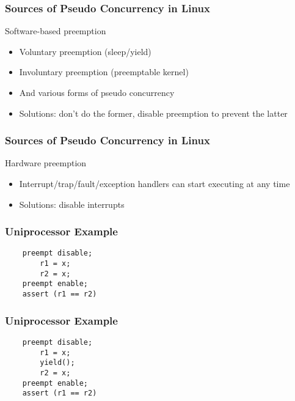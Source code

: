 \begin{frame}[fragile]
    \frametitle{Sources of Pseudo Concurrency in Linux}
    \Large
    Software-based preemption
    \begin{itemize}
        \item Voluntary preemption (sleep/yield)
        \item  Involuntary preemption (preemptable kernel)
        \item And various forms of pseudo concurrency
        \item Solutions: don't do the former, disable preemption to
        prevent the latter
               
    \end{itemize}
    
\end{frame}


\begin{frame}[fragile]
    \frametitle{Sources of Pseudo Concurrency in Linux}
    \Large
    Hardware preemption
    \begin{itemize}
        \item Interrupt/trap/fault/exception handlers can start
        executing at any time       
        \item Solutions: disable interrupts
    \end{itemize}
    
\end{frame}


\begin{frame}[fragile]
    \frametitle{Uniprocessor Example
    }
    \large    
    \begin{block}{}
        \begin{verbatim}
    preempt disable;
        r1 = x;
        r2 = x;
    preempt enable;
    assert (r1 == r2)
    \end{verbatim}
    \end{block}
    
\end{frame}

\begin{frame}[fragile]
    \frametitle{Uniprocessor Example
    }
    \large    
    \begin{block}{}
        \begin{verbatim}
    preempt disable;
        r1 = x;
        yield();
        r2 = x;
    preempt enable;
    assert (r1 == r2)
    \end{verbatim}
    \end{block}    
\end{frame}


